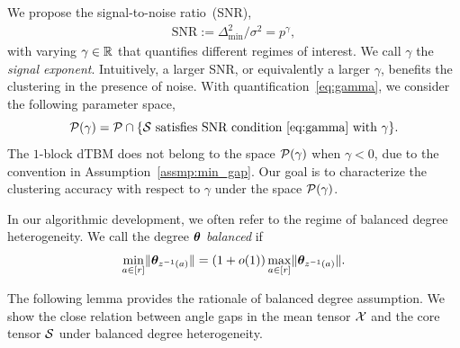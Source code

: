 \documentclass[journal]{IEEEtran}
\theoremstyle{definition}
\theoremstyle{definition}
\begin{document}
We propose the signal-to-noise ratio~(SNR),
\begin{align}\label{eq:gamma}
  \text{SNR}:= \Delta^2_{\min}/\sigma^2 = p^{\gamma}, 
\end{align}
with varying $\gamma \in \mathbb{R}$ that quantifies different regimes of interest. We call $\gamma$ the \emph{signal exponent}. Intuitively, a larger SNR, or equivalently a larger $\gamma$, benefits the clustering in the presence of noise.  With quantification~\eqref{eq:gamma}, we consider the following parameter space,
\begin{equation}\label{eq:gammafamily}
    \tP(\gamma) = \tP\cap\{\tS \text{ satisfies SNR condition~\eqref{eq:gamma} with $\gamma$} \}.
\end{equation}
The $1$-block dTBM does not belong to the space $\mathcal{P}(\gamma)$ when $\gamma < 0$, due to the convention in Assumption~\ref{assmp:min_gap}. Our goal is to characterize the clustering accuracy with respect to $\gamma$ under the space $\mathcal{P}(\gamma)$.

In our algorithmic development, we often refer to the regime of balanced degree heterogeneity. We call the degree $\boldsymbol{\theta}$ \emph{balanced} if
\begin{equation}\label{eq:degree}
{\min_{a\in[r]} \onormSize{}{\mtheta_{z^{-1}(a)}}=\left(1+o(1)\right)\max_{a\in[r]}\onormSize{}{\mtheta_{z^{-1}(a)}}}.
\end{equation}

The following lemma provides the rationale of balanced degree assumption. We show the close relation between angle gaps in the mean tensor $\mathcal{X}$ and the core tensor $\mathcal{S}$ under balanced degree heterogeneity. 
\end{document}
